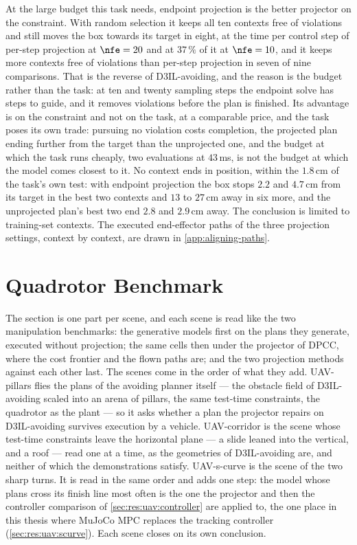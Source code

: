 At the large budget this task needs, endpoint projection is the better projector on the constraint. With
random selection it keeps all ten contexts free of violations and still moves the box towards its target in
eight, at the time per control step of per-step projection at $\nfe=20$ and at $37\,\%$ of it at $\nfe=10$, and
it keeps more contexts free of violations than per-step projection in seven of nine comparisons. That is the reverse of D3IL-avoiding,
and the reason is the budget rather than the task: at ten and twenty sampling steps the endpoint solve has steps
to guide, and it removes violations before the plan is finished. Its advantage is on the constraint and not on
the task, at a comparable price, and the task poses its own trade: pursuing no violation costs completion, the
projected plan ending further from the target than the unprojected one, and the budget at which the task runs
cheaply, two evaluations at $43$\,ms, is not the budget at which the model comes closest to it. No context ends
in position, within the $1.8$\,cm of the task's own test: with endpoint projection the box stops $2.2$ and
$4.7$\,cm from its target in the best two contexts and $13$ to $27$\,cm away in six more, and the unprojected plan's
best two end $2.8$ and $2.9$\,cm away. The conclusion is limited to training-set contexts. The executed end-effector paths of the three projection settings, context by
context, are drawn in \autoref{app:aligning-paths}.

\section{Quadrotor Benchmark}\label{sec:res:uav}

The section is one part per scene, and each scene is read like the two manipulation benchmarks: the
generative models first on the plans they generate, executed without projection; the same cells then under
the projector of \ac{DPCC}, where the cost frontier and the flown paths are; and the two projection methods
against each other last. The scenes come in the order of what they add. UAV-pillars flies the plans of the avoiding planner itself
--- the obstacle field of D3IL-avoiding scaled into an arena of pillars, the same test-time constraints, the
quadrotor as the plant --- so it asks whether a plan the projector repairs on D3IL-avoiding survives execution
by a vehicle. UAV-corridor is the scene whose test-time constraints leave the horizontal plane --- a slide leaned into
the vertical, and a roof --- read one at a time, as the geometries of D3IL-avoiding are, and neither of
which the demonstrations satisfy.
UAV-s-curve is the scene of the two sharp turns. It is read in the same order and adds one step: the model
whose plans cross its finish line most often is the one the projector and then the controller comparison
of \autoref{sec:res:uav:controller} are applied to, the one place in this thesis where MuJoCo MPC replaces
the tracking controller (\autoref{sec:res:uav:scurve}). Each scene closes on its own conclusion.

